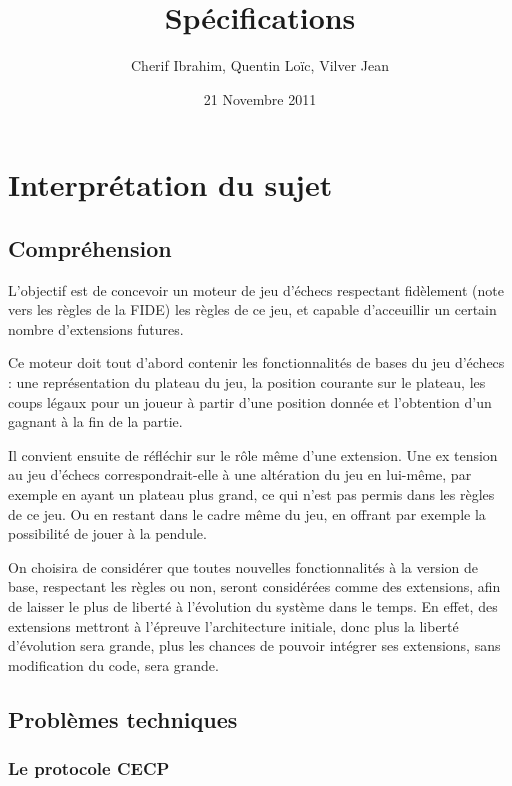 \documentclass[11pt]{article}
\title{Spécifications}
\author{Cherif Ibrahim, Quentin Loïc, Vilver Jean}
\date{21 Novembre 2011}
\begin{document}
\maketitle

\setcounter{tocdepth}{3}
\tableofcontents
\vspace*{1cm}

\section{Interprétation du sujet}
\label{sec-1}
\subsection{Compréhension}
\label{sec-1-1}

   L'objectif est de concevoir un moteur de jeu d'échecs respectant fidèlement (note vers les règles de la FIDE) les règles de ce jeu, et capable d'acceuillir un certain nombre d'extensions futures.

   Ce moteur doit tout d'abord contenir les fonctionnalités de bases du jeu d'échecs : une représentation du plateau du jeu, la position courante sur le plateau, les coups légaux pour un joueur à partir d'une position donnée et l'obtention d'un gagnant à la fin de la partie.
   
   Il convient ensuite de réfléchir sur le rôle même d'une extension. Une ex tension au jeu d'échecs correspondrait-elle à une altération du jeu en lui-même, par exemple en ayant un plateau plus grand, ce qui n'est pas permis dans les règles de ce jeu. Ou en restant dans le cadre même du jeu, en offrant par exemple la possibilité de jouer à la pendule.
   
   On choisira de considérer que toutes nouvelles fonctionnalités à la version de base, respectant les règles ou non, seront considérées comme des extensions, afin de laisser le plus de liberté à l'évolution du système dans le temps. 
En effet, des extensions mettront à l'épreuve l'architecture initiale, donc plus la liberté d'évolution sera grande, plus les chances de pouvoir intégrer ses extensions, sans modification du code, sera grande.
\subsection{Problèmes techniques}
\label{sec-1-2}
\subsubsection{Le protocole CECP}
\label{sec-1-2-1}
\end{document}
